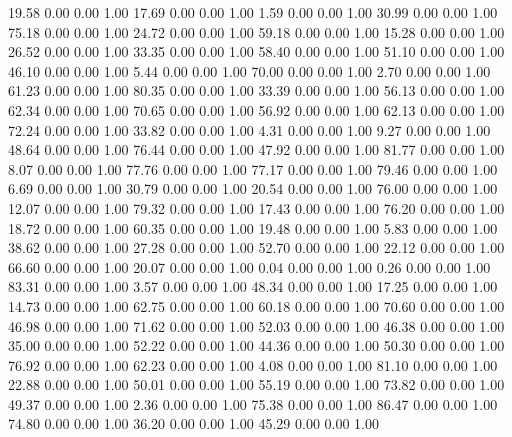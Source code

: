    19.58   0.00   0.00   1.00
   17.69   0.00   0.00   1.00
    1.59   0.00   0.00   1.00
   30.99   0.00   0.00   1.00
   75.18   0.00   0.00   1.00
   24.72   0.00   0.00   1.00
   59.18   0.00   0.00   1.00
   15.28   0.00   0.00   1.00
   26.52   0.00   0.00   1.00
   33.35   0.00   0.00   1.00
   58.40   0.00   0.00   1.00
   51.10   0.00   0.00   1.00
   46.10   0.00   0.00   1.00
    5.44   0.00   0.00   1.00
   70.00   0.00   0.00   1.00
    2.70   0.00   0.00   1.00
   61.23   0.00   0.00   1.00
   80.35   0.00   0.00   1.00
   33.39   0.00   0.00   1.00
   56.13   0.00   0.00   1.00
   62.34   0.00   0.00   1.00
   70.65   0.00   0.00   1.00
   56.92   0.00   0.00   1.00
   62.13   0.00   0.00   1.00
   72.24   0.00   0.00   1.00
   33.82   0.00   0.00   1.00
    4.31   0.00   0.00   1.00
    9.27   0.00   0.00   1.00
   48.64   0.00   0.00   1.00
   76.44   0.00   0.00   1.00
   47.92   0.00   0.00   1.00
   81.77   0.00   0.00   1.00
    8.07   0.00   0.00   1.00
   77.76   0.00   0.00   1.00
   77.17   0.00   0.00   1.00
   79.46   0.00   0.00   1.00
    6.69   0.00   0.00   1.00
   30.79   0.00   0.00   1.00
   20.54   0.00   0.00   1.00
   76.00   0.00   0.00   1.00
   12.07   0.00   0.00   1.00
   79.32   0.00   0.00   1.00
   17.43   0.00   0.00   1.00
   76.20   0.00   0.00   1.00
   18.72   0.00   0.00   1.00
   60.35   0.00   0.00   1.00
   19.48   0.00   0.00   1.00
    5.83   0.00   0.00   1.00
   38.62   0.00   0.00   1.00
   27.28   0.00   0.00   1.00
   52.70   0.00   0.00   1.00
   22.12   0.00   0.00   1.00
   66.60   0.00   0.00   1.00
   20.07   0.00   0.00   1.00
    0.04   0.00   0.00   1.00
    0.26   0.00   0.00   1.00
   83.31   0.00   0.00   1.00
    3.57   0.00   0.00   1.00
   48.34   0.00   0.00   1.00
   17.25   0.00   0.00   1.00
   14.73   0.00   0.00   1.00
   62.75   0.00   0.00   1.00
   60.18   0.00   0.00   1.00
   70.60   0.00   0.00   1.00
   46.98   0.00   0.00   1.00
   71.62   0.00   0.00   1.00
   52.03   0.00   0.00   1.00
   46.38   0.00   0.00   1.00
   35.00   0.00   0.00   1.00
   52.22   0.00   0.00   1.00
   44.36   0.00   0.00   1.00
   50.30   0.00   0.00   1.00
   76.92   0.00   0.00   1.00
   62.23   0.00   0.00   1.00
    4.08   0.00   0.00   1.00
   81.10   0.00   0.00   1.00
   22.88   0.00   0.00   1.00
   50.01   0.00   0.00   1.00
   55.19   0.00   0.00   1.00
   73.82   0.00   0.00   1.00
   49.37   0.00   0.00   1.00
    2.36   0.00   0.00   1.00
   75.38   0.00   0.00   1.00
   86.47   0.00   0.00   1.00
   74.80   0.00   0.00   1.00
   36.20   0.00   0.00   1.00
   45.29   0.00   0.00   1.00
